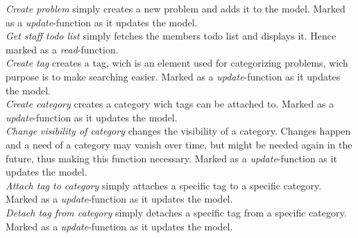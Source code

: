 
\emph{Create problem} simply creates a new problem and adds it to the model. Marked as a \textit{update}-function as it updates the model.  \\


\emph{Get staff todo list} simply fetches the \astaff[] members todo list and displays it. Hence marked as a \textit{read}-function. \\

\emph{Create tag} creates a tag, wich is an element used for categorizing problems, wich purpose is to make searching easier. Marked as a \textit{update}-function as it updates the model. \\

\emph{Create category} creates a category wich tags can be attached to. Marked as a \textit{update}-function as it updates the model. \\

\emph{Change visibility of category} changes the visibility of a category. Changes happen and a need of a category may vanish over time, but might be needed again in the future, thus making this function necessary. Marked as a \textit{update}-function as it updates the model. \\

\emph{Attach tag to category} simply attaches a specific tag to a specific category. Marked as a \textit{update}-function as it updates the model. \\

\emph{Detach tag from category} simply detaches a specific tag from a specific category. Marked as a \textit{update}-function as it updates the model. \\

